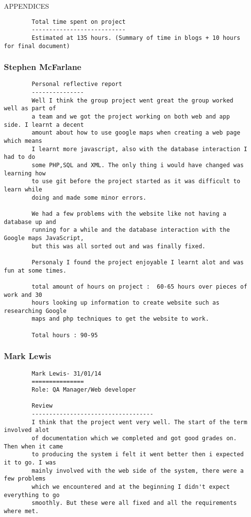 \documentclass{article}
\begin{document}
\begin{section}{APPENDICES}
\begin{verbatim}
		Total time spent on project
		---------------------------
		Estimated at 135 hours. (Summary of time in blogs + 10 hours for final document)
		\end{verbatim}
		
		\clearpage
		\subsubsection{Stephen McFarlane}
		
		\begin{verbatim}
		Personal reflective report
		---------------
		Well I think the group project went great the group worked well as part of
		a team and we got the project working on both web and app side. I learnt a decent
		amount about how to use google maps when creating a web page which means
		I learnt more javascript, also with the database interaction I had to do
		some PHP,SQL and XML. The only thing i would have changed was learning how
		to use git before the project started as it was difficult to learn while 
		doing and made some minor errors.

		We had a few problems with the website like not having a database up and 
		running for a while and the database interaction with the Google maps JavaScript, 
		but this was all sorted out and was finally fixed.

		Personaly I found the project enjoyable I learnt alot and was fun at some times. 

		total amount of hours on project :  60-65 hours over pieces of work and 30 
		hours looking up information to create website such as researching Google 
		maps and php techniques to get the website to work.

		Total hours : 90-95
		\end{verbatim}
		
		\clearpage
		\subsubsection{Mark Lewis}
		\begin{verbatim}
		Mark Lewis- 31/01/14 
		===============
		Role: QA Manager/Web developer

		Review
		-----------------------------------
		I think that the project went very well. The start of the term involved alot 
		of documentation which we completed and got good grades on. Then when it came 
		to producing the system i felt it went better then i expected it to go. I was 
		mainly involved with the web side of the system, there were a few problems 
		which we encountered and at the beginning I didn't expect everything to go 
		smoothly. But these were all fixed and all the requirements where met.
		

\end{verbatim}
\end{section}
\end{document}
